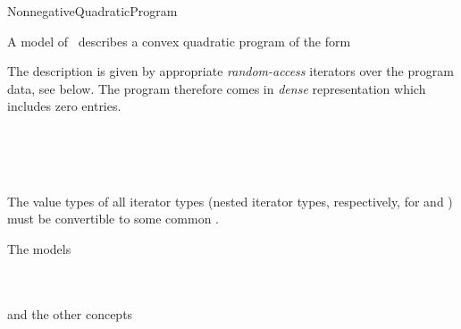\begin{ccRefConcept}{NonnegativeQuadraticProgram}

\ccDefinition
A model of \ccRefName\ describes a convex quadratic program of the form


The description is given by appropriate \emph{random-access} 
iterators over the program data, see below. The program therefore 
comes in \emph{dense} representation which includes zero entries.

\ccHasModels
{}\\
\\
\\

\ccTypes







\ccOperations








\ccRequirements

The value types of all iterator types (nested iterator types,
respectively, for  and ) must be
convertible to some common  .

\ccSeeAlso
The models

\\
\\
and the other concepts

\\
\\
\end{ccRefConcept}
